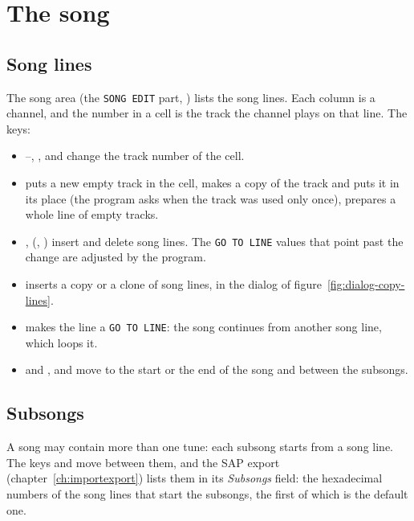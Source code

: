 \chapter{The song}\label{ch:song}

\section{Song lines}

The song area (the \texttt{SONG EDIT} part, ) lists the song lines. Each column is a channel, and the number in a cell is the
track the channel plays on that line. The keys:

\begin{itemize}
  \item {}--, ,  and  change the track number of the cell.
  \item {} puts a new empty track in the cell,  makes a copy of the track and puts it in its place
        (the program asks when the track was used only once),  prepares a whole line of empty tracks.
  \item {},  (, ) insert and delete song lines. The
        \texttt{GO TO LINE} values that point past the change are adjusted by the program.
  \item {} inserts a copy or a clone of song lines, in the dialog of figure~\ref{fig:dialog-copy-lines}.
  \item {} makes the line a \texttt{GO TO LINE}: the song continues from another song line, which loops it.
  \item {} and ,  and  move to the start or the end of the song and
        between the subsongs.
\end{itemize}


\section{Subsongs}

A song may contain more than one tune: each subsong starts from a song line. The keys  and
 move between them, and the SAP export (chapter~\ref{ch:importexport}) lists them in its \emph{Subsongs} field: the
hexadecimal numbers of the song lines that start the subsongs, the first of which is the default one.

